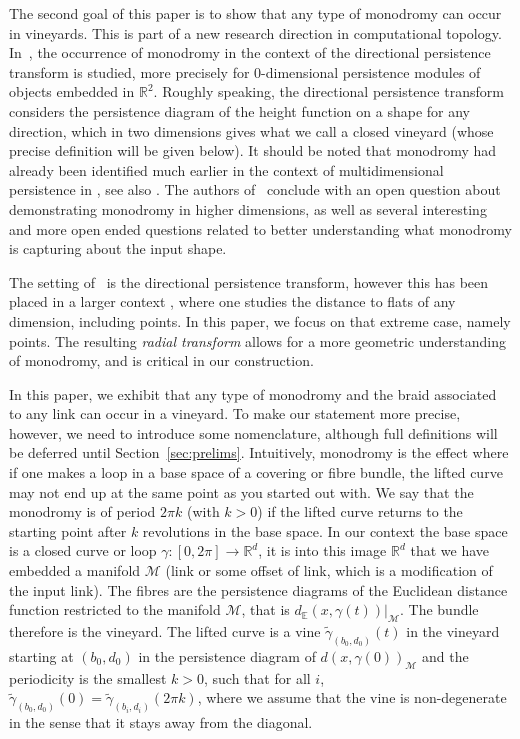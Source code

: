 \documentclass[twoside,leqno]{article}
\newcommand\R{\mathbb{R}}
\newcommand{\M}{\mathcal{M}}
\begin{document}
The second goal of this paper is to show that any type of monodromy can occur in vineyards. This is part of a new research direction in computational topology. In~\cite{Arya2024}, the occurrence of monodromy in the context of the directional persistence transform is studied, more precisely for 0-dimensional persistence modules of objects embedded in $\mathbb{\R}^2$. 
Roughly speaking, the directional persistence transform considers the persistence diagram of the height function on a shape for any direction, which in two dimensions gives what we call a closed vineyard (whose precise definition will be given below). 
It should be noted that monodromy had already been identified much earlier in the context of multidimensional persistence in \cite{Cerri2013}, see also \cite{AATRNsara}. 
The authors of~\cite{Arya2024} conclude with an open question about demonstrating monodromy in higher dimensions, as well as several interesting and more open ended questions related to better understanding what monodromy is capturing about the input shape.  

The setting of~\cite{Arya2024} is the directional persistence transform, however this has been placed in a larger context \cite{onus2024shovingtubesshapesgives}, where one studies the distance to flats of any dimension, including points. In this paper, we focus on that extreme case, namely points. The resulting \emph{radial transform} allows for a more geometric understanding of monodromy, and is critical in our construction.


%

In this paper, we exhibit that any type of monodromy and the braid associated to any link can occur in a vineyard. To make our statement more precise, however, we need to introduce some nomenclature, although full definitions will be deferred until Section~\ref{sec:prelims}. 
Intuitively, monodromy is the effect where if one makes a loop in a base space of a covering or fibre bundle, the lifted curve may not end up at the same point as you started out with. We say that the monodromy is of period $2\pi k$ (with $k>0$) if the lifted curve returns to the starting point after $k$ revolutions in the base space.
In our context the base space is a closed curve or loop $\gamma: [0,2 \pi] \to \mathbb{R}^d$, it is into this image $\mathbb{R}^d$ that we have embedded a manifold $\M$ (link or some offset of link, which is a modification of the input link). The fibres are the persistence diagrams of the Euclidean distance function restricted to the manifold $\M$, that is $d_\mathbb{E} (x, \gamma(t))|_\M$. The bundle therefore is the vineyard. 
The lifted curve is a vine $\tilde{\gamma}_{(b_0,d_0)} (t)$ in the vineyard starting at $(b_0,d_0)$ in the persistence diagram of $d (x, \gamma(0))_\M$ and the periodicity is the smallest $k>0$, such that for all $i$, $\tilde{\gamma}_{(b_0,d_0)} (0)= \tilde{\gamma}_{(b_i,d_i)} (2 \pi k)$, where we assume that the vine is non-degenerate in the sense that it stays away from the diagonal. 
\end{document}
